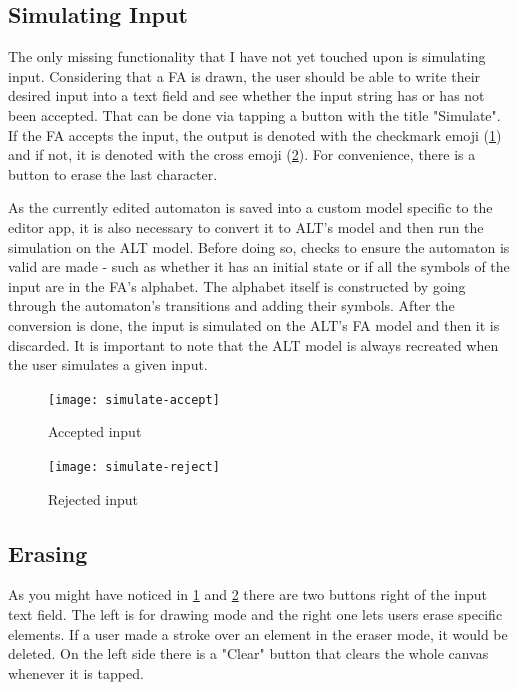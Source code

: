 \subsection{Simulating Input}

The only missing functionality that I have not yet touched upon is simulating input. Considering that a FA is drawn, the user should be able to write their desired input into a text field and see whether the input string has or has not been accepted. That can be done via tapping a button with the title "Simulate". If the FA accepts the input, the output is denoted with the checkmark emoji (\ref{simulate-accept}) and if not, it is denoted with the cross emoji (\ref{simulate-reject}). For convenience, there is a button to erase the last character.

As the currently edited automaton is saved into a custom model specific to the editor app, it is also necessary to convert it to ALT's model and then run the simulation on the ALT model. Before doing so, checks to ensure the automaton is valid are made - such as whether it has an initial state or if all the symbols of the input are in the FA's alphabet. The alphabet itself is constructed by going through the automaton's transitions and adding their symbols. After the conversion is done, the input is simulated on the ALT's FA model and then it is discarded. It is important to note that the ALT model is always recreated when the user simulates a given input.

\begin{figure}
    \texttt{[image: simulate-accept]}
    \caption{Accepted input}\label{simulate-accept}
\end{figure}

\begin{figure}
    \texttt{[image: simulate-reject]}
    \caption{Rejected input}\label{simulate-reject}
\end{figure}

\subsection{Erasing}

As you might have noticed in \ref{simulate-accept} and \ref{simulate-reject} there are two buttons right of the input text field. The left is for drawing mode and the right one lets users erase specific elements. If a user made a stroke over an element in the eraser mode, it would be deleted. On the left side there is a "Clear" button that clears the whole canvas whenever it is tapped.

